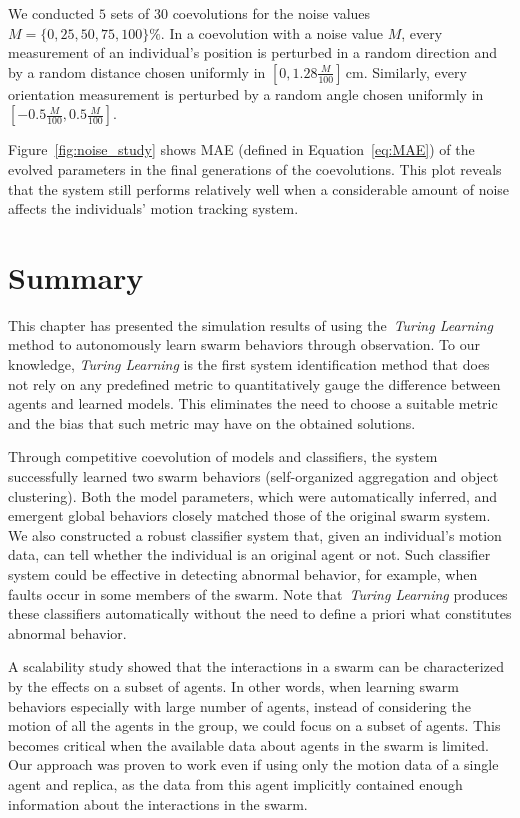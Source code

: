 We conducted $5$ sets of $30$ coevolutions for the noise values $M=\{0, 25, 50, 75, 100\}\%$. In a coevolution with a noise value $M$, every measurement of an individual's position is perturbed in a random direction and by a random distance chosen uniformly in $\left[0, 1.28\frac{M}{100}\right] \,\textrm{cm}$. Similarly, every orientation measurement is perturbed by a random angle chosen uniformly in $\left[-0.5\frac{M}{100}, 0.5\frac{M}{100}\right]$.

Figure~\ref{fig:noise_study} shows MAE (defined in Equation~\eqref{eq:MAE}) of the evolved parameters in the final generations of the coevolutions. This plot reveals that the system still performs relatively well when a considerable amount of noise affects the individuals' motion tracking system.

\section{Summary}\label{sec:summary_simulation_swarm}

This chapter has presented the simulation results of using the~\textit{Turing Learning} method to autonomously learn swarm behaviors through observation. To our knowledge, \textit{Turing Learning} is the first system identification method that does not rely on any predefined metric to quantitatively gauge the difference between agents and learned models. This eliminates the need to choose a suitable metric and the bias that such metric may have on the obtained solutions. 

Through competitive coevolution of models and classifiers, the system successfully learned two swarm behaviors (self-organized aggregation and object clustering). Both the model parameters, which were automatically inferred, and emergent global behaviors closely matched those of the original swarm system. We also constructed a robust classifier system that, given an individual's motion data, can tell whether the individual is an original agent or not. Such classifier system could be effective in detecting abnormal behavior, for example, when faults occur in some members of the swarm. Note that~\textit{Turing Learning} produces these classifiers automatically without the need to define a priori what constitutes abnormal behavior. 

A scalability study showed that the interactions in a swarm can be characterized by the effects on a subset of agents. In other words, when learning swarm behaviors especially with large number of agents, instead of considering the motion of all the agents in the group, we could focus on a subset of agents. This becomes critical when the available data about agents in the swarm is limited. Our approach was proven to work even if using only the motion data of a single agent and replica, as the data from this agent implicitly contained enough information about the interactions in the swarm.   

